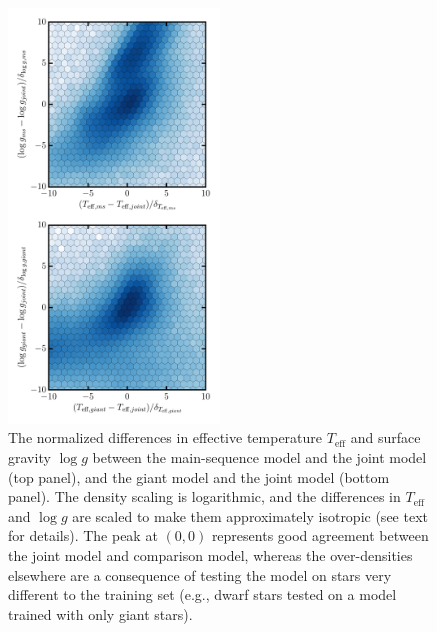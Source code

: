 \documentclass[preprint,trackchanges]{aastex}
\newcommand{\teff}{T_{\mathrm{eff}}}
\newcommand{\logg}{\log g}
\begin{document}
\begin{figure}[p]
\center
\includegraphics[width=0.5\textwidth]{figures/joint-model-differences.pdf}
\caption{The normalized differences in effective temperature $\teff$ and surface gravity $\logg$ between the main-sequence model and the joint model (top panel), and the giant model and the joint model (bottom panel).  The density scaling is logarithmic, and the differences in $\teff$ and $\logg$ are scaled to make them approximately isotropic (see text for details).  The peak at $(0, 0)$ represents good agreement between the joint model and comparison model, whereas the over-densities elsewhere are a consequence of testing the model on stars very different to the training set (e.g., dwarf stars tested on a model trained with only giant stars).\label{fig:joint-model-differences}}
\end{figure}
\end{document}
